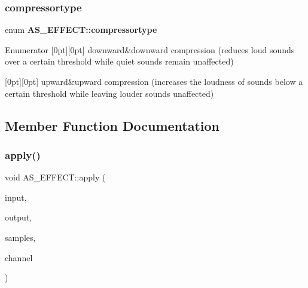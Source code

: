 \subsubsection{compressortype}
{\footnotesize\ttfamily enum \textbf{ A\+S\+\_\+\+E\+F\+F\+E\+C\+T\+::compressortype}\hspace{0.3cm}{\ttfamily [private]}}

\begin{DoxyEnumFields}{Enumerator}
[0pt][0pt]{}\mbox{\label{class_a_s___e_f_f_e_c_t_a3c75445cc4db5c365d186af35c38c96aacd7bc3da4b1aa640691324eaf5420f46}} 
downward&downward compression (reduces loud sounds over a certain threshold while quiet sounds remain unaffected) \\
\hline

[0pt][0pt]{}\mbox{\label{class_a_s___e_f_f_e_c_t_a3c75445cc4db5c365d186af35c38c96aa7a2b4f6c673de4e2ff456d247463610d}} 
upward&upward compression (increases the loudness of sounds below a certain threshold while leaving louder sounds unaffected) \\
\hline

\end{DoxyEnumFields}


\subsection{Member Function Documentation}
\mbox{\label{class_a_s___e_f_f_e_c_t_a888ec464e417c6654da11f893f1aa97f}} 
\subsubsection{apply()\hspace{0.1cm}{\footnotesize\ttfamily [1/3]}}
{\footnotesize\ttfamily void A\+S\+\_\+\+E\+F\+F\+E\+C\+T\+::apply (\begin{DoxyParamCaption}\item[{float $\ast$}]{input,  }\item[{float $\ast$}]{output,  }\item[{int}]{samples,  }\item[{\textbf{ S\+A\+C\+Bitstream\+::\+Channel\+Type\+::channeltype}}]{channel }\end{DoxyParamCaption})}

